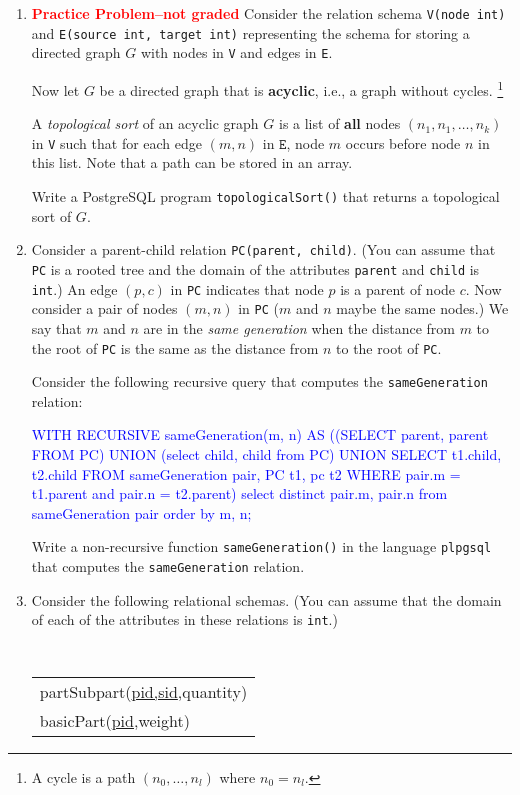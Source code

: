 \documentclass{article}
\renewenvironment{alltt}{\vspace{-0.75\baselineskip}\begin{oldalltt}}{\end{oldalltt}\vspace{+0.50\baselineskip}}
\begin{document}
\begin{enumerate}[resume]
\item \textcolor{red}{\bf Practice Problem--not graded}
Consider the relation schema {\tt V(node int)} and {\tt E(source int, target int)}
representing the schema for storing a directed graph $G$ with nodes in  {\tt V} and
edges in {\tt E}.

Now let $G$ be a directed graph that is {\bf acyclic}, i.e., a graph without cycles.
\footnote{A cycle is
a path $(n_0,\ldots, n_l)$ where $n_0=n_l$.}

A \emph{topological sort} of an acyclic graph $G$ is a list of {\bf all} nodes 
$(n_1,n_1,\ldots, n_k)$ in {\tt V} such that for each edge $(m,n)$ in $\mathtt{E}$,
node $m$ occurs before node $n$ in this list.   Note that a path can be stored in an array.

Write a PostgreSQL program {\tt topologicalSort()} that returns a
topological sort of $G$.

\item Consider a parent-child relation {\tt PC(parent, child)}. (You can assume that {\tt PC} is a rooted tree and the domain of the attributes {\tt parent} and {\tt child} is {\tt int}.)  An edge $(p,c)$ in {\tt PC} indicates
that node $p$ is a parent of node $c$.   Now consider a pair of nodes $(m,n)$ in {\tt PC} ($m$ and $n$ maybe the same nodes.)   We say that 
$m$ and $n$ are in the \emph{same generation} when the distance from $m$ to the root of {\tt PC} is the same as the distance from $n$ to the root of {\tt PC}.   

Consider the following recursive query that computes the {\tt sameGeneration} relation:
\begin{alltt}\textcolor{blue}{
WITH RECURSIVE sameGeneration(m, n) AS
     ((SELECT parent, parent FROM PC) UNION (select child, child from PC)
     UNION
     SELECT  t1.child, t2.child
     FROM    sameGeneration pair, PC t1, pc t2
     WHERE   pair.m = t1.parent and pair.n = t2.parent)
select distinct pair.m, pair.n from sameGeneration pair order by m, n;}
\end{alltt}

Write a non-recursive function {\tt sameGeneration()} in the language {\tt plpgsql} that computes the {\tt sameGeneration} relation.

\newpage



\item Consider the following relational schemas.  (You can assume that the domain of each of the attributes in these relations is {\tt int}.)
\begin{center}
{\tt 
\begin{tabular}{l}
partSubpart(\underline{pid,sid},quantity) \\
basicPart(\underline{pid},weight)
\end{tabular}
}
\end{center}


\end{enumerate}
\end{document}
